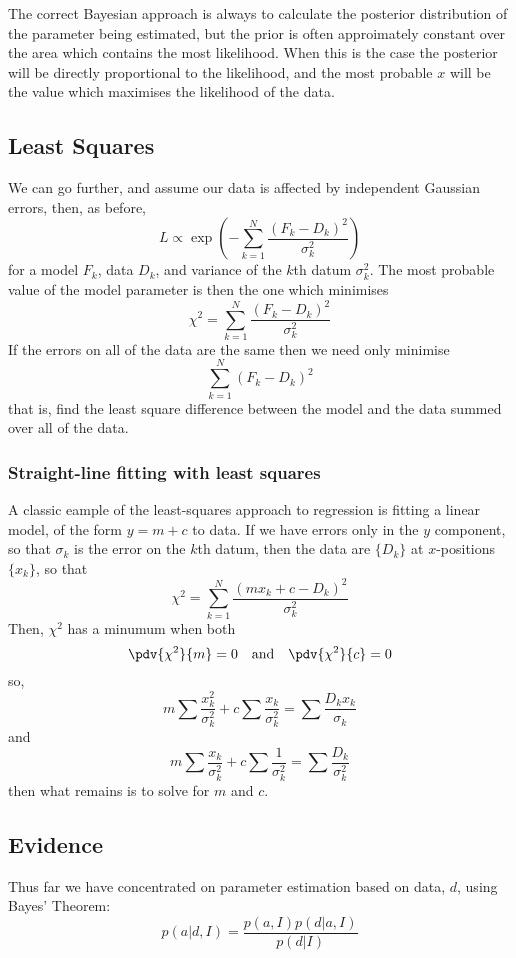 \documentclass{dwnotes}         		        %
\begin{document}
The correct Bayesian approach is always to calculate the posterior
distribution of the parameter being estimated, but the prior is often
approimately constant over the area which contains the most
likelihood. When this is the case the posterior will be directly
proportional to the likelihood, and the most probable $x$ will be the
value which maximises the likelihood of the data.

\subsection{Least Squares}
\label{sec:least-squares}

We can go further, and assume our data is affected by independent Gaussian errors, then, as before,
\[ L \propto \exp( - \sum_{k=1}^N \frac{(F_k - D_k)^2}{\sigma_k^2}
) \] for a model $F_k$, data $D_k$, and variance of the $k$th datum
$\sigma_k^2$. The most probable value of the model parameter is then the one which minimises
\[ \chi^2 = \sum_{k=1}^N \frac{(F_k - D_k)^2}{\sigma_k^2} \] If the
errors on all of the data are the same then we need only minimise
\[ \sum_{k=1}^N (F_k - D_k)^2 \] that is, find the least square
difference between the model and the data summed over all of the data.

\subsubsection{Straight-line fitting with least squares}
\label{sec:stra-line-fitt}

A classic eample of the least-squares approach to regression is
fitting a linear model, of the form $y = m +c$ to data. If we have
errors only in the $y$ component, so that $\sigma_k$ is the error on
the $k$th datum, then the data are $\{ D_k \}$ at $x$-positions $\{
x_k \}$, so that
\[ \chi^2 = \sum^N_{k=1} \frac{(m x_k + c - D_k)^2}{\sigma_k^2} \]
Then, $\chi^2$ has a minumum when both
\[ \pdv{\chi^2}{m} = 0 \quad \text{and} \quad \pdv{\chi^2}{c}=0 \]
so,
\[ m \sum \frac{x_k^2}{\sigma_k^2} + c \sum \frac{x_k}{\sigma^2_k} = \sum \frac{D_k x_k}{\sigma_k} \]
and
\[ m \sum \frac{x_k}{\sigma_k^2} + c \sum \frac{1}{\sigma_k^2} = \sum
\frac{D_k}{\sigma_k^2} \] then what remains is to solve for $m$ and
$c$.

\subsection{Evidence}
\label{sec:evidence}

Thus far we have concentrated on parameter estimation based on data,
$d$, using Bayes' Theorem:
\[ p(a|d,I) = \frac{p(a,I) p(d|a,I)}{p(d|I)} \]
\end{document}
